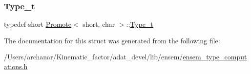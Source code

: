 \subsubsection{\texorpdfstring{Type\_t}{Type\_t}\hspace{0.1cm}{\footnotesize\ttfamily [2/2]}}
{\footnotesize\ttfamily typedef short \mbox{\hyperlink{structPromote}{Promote}}$<$ short, char $>$\+::\mbox{\hyperlink{structPromote_3_01short_00_01char_01_4_ad7373b6a3ec65f1b36fa8c03e0f390f6}{Type\+\_\+t}}}



The documentation for this struct was generated from the following file\+:\begin{DoxyCompactItemize}
\item 
/\+Users/archanar/\+Kinematic\+\_\+factor/adat\+\_\+devel/lib/ensem/\mbox{\hyperlink{lib_2ensem_2ensem__type__computations_8h}{ensem\+\_\+type\+\_\+computations.\+h}}\end{DoxyCompactItemize}
